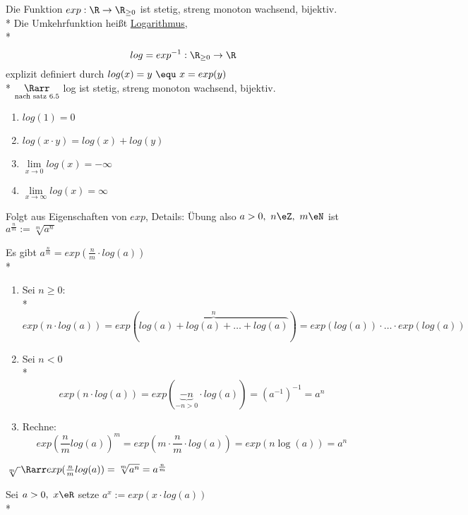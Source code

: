 Die Funktion $exp: \R \to \R_{\geq 0}$ ist stetig, streng monoton wachsend, bijektiv.\\*
Die Umkehrfunktion heißt \ul{Logarithmus},\\*
$$log = exp^{-1}: \R_{\geq 0} \to \R$$
explizit definiert durch $log(x) = y\ \equ\ x = exp(y)$\\*
$\underset{\text{\scriptsize{nach satz 6.5}}}{\Rarr}$ log ist stetig, streng monoton wachsend, bijektiv.
\begin{enumerate}
\item{$log(1)=0$}
\item{$log(x·y)=log(x)+log(y)$}
\item{$\lim\limits_{x→0}log(x)=-∞$}
\item{$\lim\limits_{x→∞}log(x)=∞$}
\end{enumerate}
\bew
Folgt aus Eigenschaften von $exp$, Details: Übung
also $a>0,\ n\eZ,\ m\eN$ ist $a^{\frac{n}{m}}:=\sqrt[m]{a^n}$

Es gibt $a^{\frac{n}{m}} =  exp(\frac{n}{m} \cdot log(a))$\\*
\bew
	\begin{enumerate}
	\item{Sei $n \geq 0$:\\*
	$$exp(n \cdot log(a)) = exp(\overbrace{log(a) + log(a) + …+ log(a)}^{n}) = exp(log(a)) \cdot … \cdot exp(log(a))$$}
	\item{Sei $n < 0$\\*
	 $$exp(n \cdot log(a)) = exp(\underbrace{-n}_{-n > 0} \cdot log (a)) = (a^{-1})^{-1} = a^n$$}
	 \item{Rechne: $$exp(\frac{n}{m} log(a))^m = exp(m \cdot \frac{n}{m} \cdot log(a)) = exp(n \log(a)) = a^n$$}
	\end{enumerate}	 
	$\sqrt[m]{\ } \Rarr exp(\frac{n}{m} log(a)) = \sqrt[m]{a^n} = a^{\frac{n}{m}}$

Sei $a>0,\ x\eR$ setze $a^x:=exp(x·log(a))$\\*

